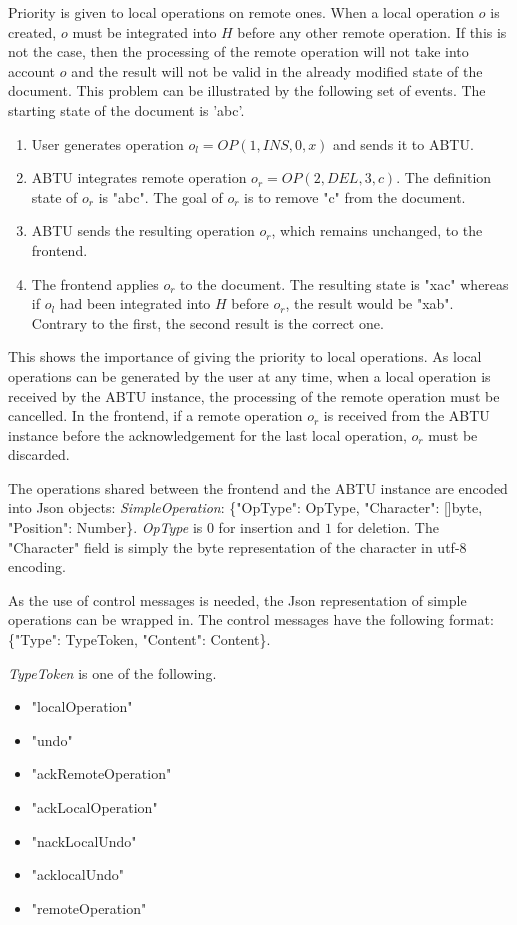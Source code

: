 \documentclass[11pt, a4paper, oneside, openright]{article} %
\begin{document}
Priority is given to local operations on remote ones. When a local operation $o$ is created, $o$ must be integrated into $H$ before any other remote operation. If this is not the case, then the processing of the remote operation will not take into account $o$ and the result will not be valid in the already modified state of the document. This problem can be illustrated by the following set of events. The starting state of the document is 'abc'.

\begin{enumerate}
\item User generates operation $o_l = OP(1, INS, 0,  x)$ and sends it to ABTU.
\item ABTU integrates remote operation $o_r = OP(2, DEL, 3, c)$. The definition state of $o_r$ is "abc". The goal of $o_r$ is to remove "c" from the document.
\item ABTU sends the resulting operation $o_r$, which remains unchanged, to the frontend.
\item The frontend applies $o_r$ to the document. The resulting state is "xac" whereas if $o_l$ had been integrated into $H$ before $o_r$, the result would be "xab". Contrary to the first, the second result is the correct one.
\end{enumerate}

This shows the importance of giving the priority to local operations. As local operations can be generated by the user at any time, when a local operation is received by the ABTU instance, the processing of the remote operation must be cancelled. In the frontend, if a remote operation $o_r$ is received from the ABTU instance before the acknowledgement for the last local operation, $o_r$ must be discarded.

The operations shared between the frontend and the ABTU instance are encoded into Json objects:  \textit{SimpleOperation}: \{"OpType": OpType, "Character": []byte, "Position": Number\}. \textit{OpType} is $0$ for insertion and $1$ for deletion. The "Character" field is simply the byte representation of the character in utf-8 encoding. 

As the use of control messages is needed, the Json representation of simple operations can be wrapped in. The control messages have the following format: \{"Type": TypeToken, "Content": Content\}.

\textit{TypeToken } is one of the following.
\begin{itemize}
\item "localOperation"
\item "undo"
\item "ackRemoteOperation"
\item "ackLocalOperation"
\item "nackLocalUndo"
\item "acklocalUndo"
\item "remoteOperation"
\end{itemize}
\end{document}
